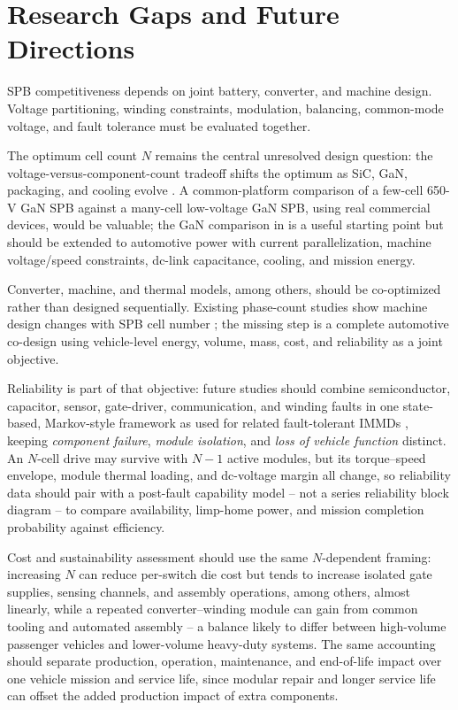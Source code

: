 \section{Research Gaps and Future Directions}
\label{sec:future_directions}

SPB competitiveness depends on joint battery, converter, and machine
design. 
Voltage partitioning, winding constraints, modulation, balancing,
common-mode voltage, and fault tolerance must be evaluated together.

The optimum cell count $N$ remains the central unresolved design
question:
the voltage-versus-component-count tradeoff shifts the optimum as
SiC, GaN, packaging, and cooling evolve
\cite{WBGTractionReview2025,Post800V2026}. A
common-platform comparison of a few-cell 650-V GaN SPB against a
many-cell low-voltage GaN SPB, using real commercial devices, would be
valuable; the GaN comparison in \cite{Rohner2024GaN} is a useful
starting point but should be extended to automotive power with current
parallelization, machine voltage/speed constraints, dc-link
capacitance, cooling, and mission energy.

Converter, machine, and thermal models, among others, should
be co-optimized rather than designed sequentially. Existing phase-count
studies show machine design changes with SPB cell number
\cite{Bringezu2020SPB}; the missing step is a complete automotive
co-design using vehicle-level energy, volume, mass, cost, and
reliability as a joint objective.

Reliability is part of that objective: future studies should combine
semiconductor, capacitor, sensor, gate-driver, communication, and
winding faults \cite{Nikouie2016Fault,Verkroost2024Reconfiguration} in one
state-based, Markov-style framework as used for related fault-tolerant
IMMDs \cite{Swanke2022MarkovReliability}, keeping \emph{component
failure}, \emph{module isolation}, and \emph{loss of vehicle function}
distinct.
An $N$-cell drive may survive with $N-1$ active modules, but its
torque--speed envelope, module thermal loading, and dc-voltage margin
all change, so reliability data should pair with a post-fault
capability model -- not a series reliability block diagram -- to
compare availability, limp-home power, and mission completion
probability against efficiency.

Cost and sustainability assessment should use the same $N$-dependent
framing: increasing $N$ can reduce per-switch die cost but tends to
increase isolated gate supplies, sensing channels, and assembly
operations, among others, almost linearly, while a
repeated converter--winding module can gain from common tooling and
automated assembly -- a balance likely to differ between high-volume
passenger vehicles and lower-volume heavy-duty systems. The same
accounting should separate production, operation, maintenance, and
end-of-life impact over one vehicle mission and service life, since
modular repair and longer service life can offset the added production
impact of extra components.

